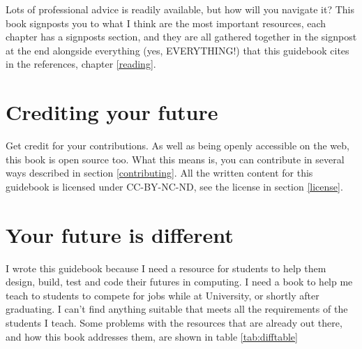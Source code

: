 \documentclass[
]{book}
\begin{document}
Lots of professional advice is readily available, but how will you navigate it? This book signposts you to what I think are the most important resources, each chapter has a signposts section, and they are all gathered together in the signpost at the end alongside everything (yes, EVERYTHING!) that this guidebook cites in the references, chapter \ref{reading}.

\hypertarget{crediting}{%
\section{Crediting your future}\label{crediting}}

Get credit for your contributions. As well as being openly accessible on the web, this book is open source too. What this means is, you can contribute in several ways described in section \ref{contributing}. All the written content for this guidebook is licensed under CC-BY-NC-ND, see the license in section \ref{license}.

\hypertarget{thinkdifferent}{%
\section{Your future is different}\label{thinkdifferent}}

I wrote this guidebook because I need a resource for students to help them design, build, test and code their futures in computing. I need a book to help me teach to students to compete for jobs while at University, or shortly after graduating. I can't find anything suitable that meets all the requirements of the students I teach. Some problems with the resources that are already out there, and how this book addresses them, are shown in table \ref{tab:difftable}
\end{document}
